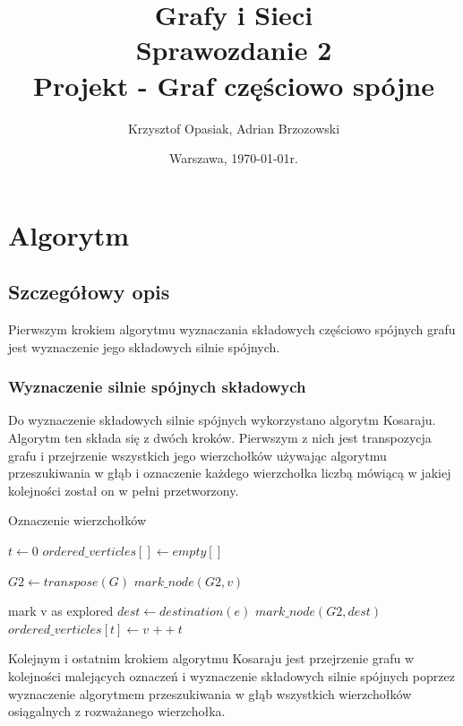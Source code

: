 \documentclass[a4paper,10pt]{article}
\title{{\textbf{Grafy i Sieci}}\\[1ex]
       {\Large Sprawozdanie 2}\\[-1ex]
       {\Large Projekt - Graf częściowo spójne}}
\author{Krzysztof Opasiak, Adrian Brzozowski}
\date{Warszawa, \today r.}
\begin{document}
\maketitle

\section{Algorytm}
\subsection{Szczegółowy opis}

Pierwszym krokiem algorytmu wyznaczania składowych częściowo spójnych
grafu jest wyznaczenie jego składowych silnie spójnych.

\subsubsection{Wyznaczenie silnie spójnych składowych}
Do wyznaczenie składowych silnie spójnych wykorzystano algorytm
Kosaraju. Algorytm ten składa się z dwóch kroków. Pierwszym z nich
jest transpozycja grafu i przejrzenie wszystkich jego wierzchołków
używając algorytmu przeszukiwania w głąb i oznaczenie każdego
wierzchołka liczbą mówiącą w jakiej kolejności został on w pełni
przetworzony.

\begin{algorithm}
\caption{Oznaczenie wierzchołków}
\begin{algorithmic}
\State $t \leftarrow 0 $
\State $ordered\_verticles[] \leftarrow empty[]$

\State $G2 \leftarrow transpose(G)$
    \State $mark\_node(G2, v)$
  \EndIf
\EndFor
\EndFunction

  \State mark v as explored
    \State $dest \leftarrow destination(e)$
      \State $mark\_node(G2, dest)$
    \EndIf
  \EndFor
  \State $ordered\_verticles[t] \leftarrow v$
  \State $++t $
\EndFunction
\end{algorithmic}
\end{algorithm}

Kolejnym i ostatnim krokiem algorytmu Kosaraju jest przejrzenie grafu
w kolejności malejących oznaczeń i wyznaczenie składowych silnie
spójnych poprzez wyznaczenie algorytmem przeszukiwania w głąb
wszystkich wierzchołków osiągalnych z rozważanego wierzchołka.
\end{document}
